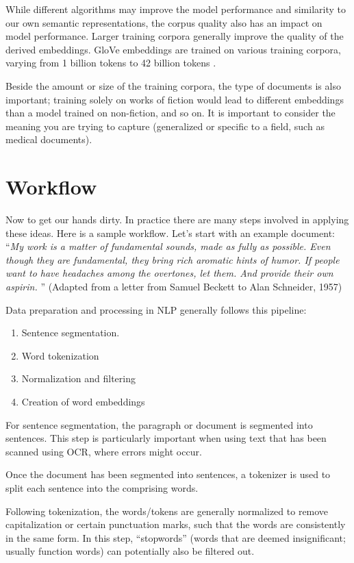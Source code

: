 While different algorithms may improve the model performance and similarity to our own semantic representations, the corpus quality also has an impact on model performance.
Larger training corpora generally improve the quality of the derived embeddings. 
GloVe embeddings are trained on various training corpora, varying from 1 billion tokens to 42 billion tokens \cite{pennington2014glove}.

Beside the amount or size of the training corpora, the type of documents is also important; training solely on works of fiction would lead to different embeddings than a model trained on non-fiction, and so on. It is important to consider the meaning you are trying to capture (generalized or specific to a field, such as medical documents).

\section{Workflow}


Now to get our hands dirty. In practice there are many steps involved in applying these ideas. 
Here is a sample workflow. Let's start with an example document: ``\textit{My work is a matter of fundamental sounds, made as fully as possible. Even though they are fundamental, they bring rich aromatic hints of humor. If people want to have headaches among the overtones, let them. And provide their own aspirin. }'' (Adapted from a letter from Samuel Beckett to Alan Schneider, 1957)

Data preparation and processing in NLP generally follows this pipeline: 

\begin{enumerate}
\item Sentence segmentation.
\item Word tokenization
\item Normalization and filtering
\item Creation of word embeddings
\end{enumerate}

For sentence segmentation, the paragraph or document is segmented into sentences. This step is particularly important when using text that has been scanned using OCR, where errors might occur.

Once the document has been segmented into sentences, a tokenizer is used to split each sentence into the comprising words. 

Following tokenization, the words/tokens are generally normalized to remove capitalization or certain punctuation marks, such that the words are consistently in the same form. In this step, ``stopwords'' (words that are deemed insignificant; usually function words) can potentially also be filtered out.

